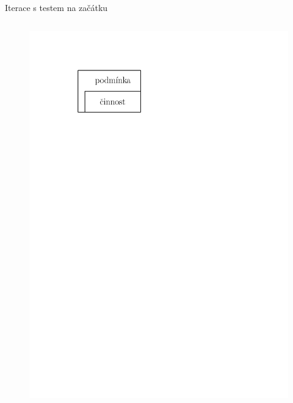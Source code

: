 \documentclass[11pt,aspectratio=169]{beamer}
\begin{document}
\begin{frame}{Iterace s testem na začátku}
\begin{columns}
\begin{column}{.5\textwidth}
\begin{figure}
                    \centering
                    \includegraphics[scale=.5]{../images/00-strukturogram-iterace-zacatek.pdf}
                \end{figure}
            \end{column}
        \end{columns}
    \end{frame}
\end{document}
